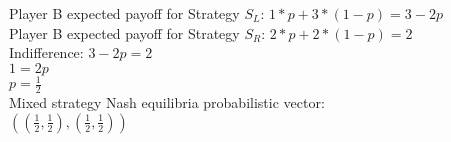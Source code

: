 \documentclass[twoside]{article}
\begin{document}
Player B expected payoff for Strategy $S_{L}$: $1*p + 3*(1-p) = 3 - 2p$ \\
Player B expected payoff for Strategy $S_{R}$: $2*p + 2*(1-p) = 2$ \\
Indifference: 
$3 - 2p = 2$ \\
$1 = 2p$ \\
$p = \frac{1}{2}$ \\

Mixed strategy Nash equilibria probabilistic vector: \\
$((\frac{1}{2}, \frac{1}{2}), (\frac{1}{2}, \frac{1}{2}))$
\end{document}
